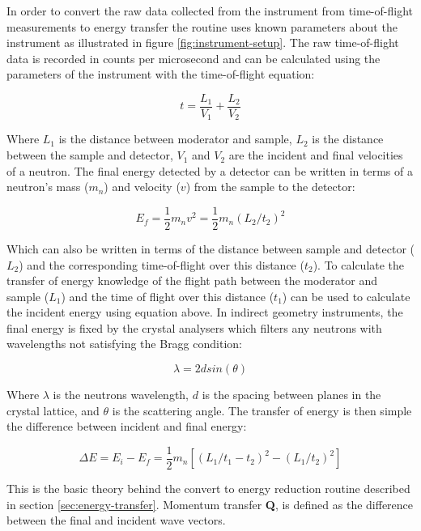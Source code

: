\documentclass[paper=a4, fontsize=11pt]{scrartcl}	%
\numberwithin{equation}{section}															%
\numberwithin{figure}{section}																%
\numberwithin{table}{section}																%
\begin{document}
In order to convert the raw data collected from the instrument from time-of-flight measurements to energy transfer the routine uses known parameters about the instrument as illustrated in figure \ref{fig:instrument-setup}. The raw time-of-flight data is recorded in counts per microsecond and can be calculated using the parameters of the instrument with the time-of-flight equation:

\begin{equation}
\label{eq:time-of-flight}
t = \frac{L_1}{V_1} + \frac{L_2}{V_2}
\end{equation}

Where $L_1$ is the distance between moderator and sample, $L_2$ is the distance between the sample and detector, $V_1$ and $V_2$ are the incident and final velocities of a neutron. The final energy detected by a detector can be written in terms of a neutron's mass ($m_{n}$) and velocity ($v$) from the sample to the detector:

\begin{equation}
E_f = \frac{1}{2}m_{n}v^2 = \frac{1}{2}m_{n} ( L_2 / t_2 ) ^2
\end{equation}

Which can also be written in terms of the distance between sample and detector ($L_2$) and the corresponding time-of-flight over this distance ($t_2$). To calculate the transfer of energy knowledge of the flight path between the moderator and sample ($L_1$) and the time of flight over this distance ($t_1$) can be used to calculate the incident energy using equation above. In indirect geometry instruments, the final energy is fixed by the crystal analysers which filters any neutrons with wavelengths not satisfying the Bragg condition:

\begin{equation}
\label{eq:braggs-law}
\lambda = 2dsin(\theta)
\end{equation}

Where $\lambda$ is the neutrons wavelength, $d$ is the spacing between planes in the crystal lattice, and $\theta$ is the scattering angle. The transfer of energy is then simple the difference between incident and final energy:

\begin{equation}
\Delta E = E_i - E_f = \frac{1}{2}m_n[(L_1 / t_1-t_2)^2 - (L_1/t_2)^2]
\end{equation}

This is the basic theory behind the convert to energy reduction routine described in section \ref{sec:energy-transfer}. Momentum transfer \textbf{Q}, is defined as the difference between the final and incident wave vectors.
\end{document}
